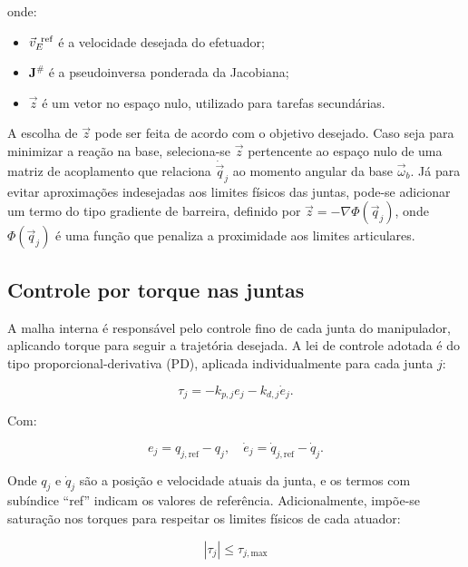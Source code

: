 onde:
\begin{itemize}
    \item $ \vec{v}_E^{\text{\, ref}} $ é a velocidade desejada do efetuador;
    \item $ \mathbf{J}^\# $ é a pseudoinversa ponderada da Jacobiana;
    \item $ \vec{z} $ é um vetor no espaço nulo, utilizado para tarefas secundárias.
\end{itemize}

A escolha de $ \vec{z} $ pode ser feita de acordo com o objetivo desejado.
Caso seja para minimizar a reação na base, seleciona-se $ \vec{z} $ pertencente ao espaço nulo de uma matriz de acoplamento que relaciona $ \dot{\vec{q}}_j $ ao momento angular da base $ \vec{\omega}_b $.
Já para evitar aproximações indesejadas aos limites físicos das juntas, pode-se adicionar um termo do tipo gradiente de barreira, definido por $ \vec{z} = -\nabla \Phi(\vec{q}_j) $, onde $ \Phi(\vec{q}_j) $ é uma função que penaliza a proximidade aos limites articulares.

\subsection{Controle por torque nas juntas}

A malha interna é responsável pelo controle fino de cada junta do manipulador, aplicando torque para seguir a trajetória desejada. A lei de controle adotada é do tipo proporcional-derivativa (PD), aplicada individualmente para cada junta $ j $:

\begin{equation}
\tau_j = -k_{p,j} e_j - k_{d,j} \dot{e}_j.
\label{eq:controle_PD_junta}
\end{equation}

Com:

\begin{equation}
e_j = q_{j,\text{ref}} - q_j, \quad \dot{e}_j = \dot{q}_{j,\text{ref}} - \dot{q}_j.
\label{eq:erro_PD_junta}
\end{equation}

Onde $ q_j $ e $ \dot{q}_j $ são a posição e velocidade atuais da junta, e os termos com subíndice “ref” indicam os valores de referência.
Adicionalmente, impõe-se saturação nos torques para respeitar os limites físicos de cada atuador:

\begin{equation}
|\tau_j| \leq \tau_{j,\text{max}}
\label{eq:saturacao_torque_junta}
\end{equation}

